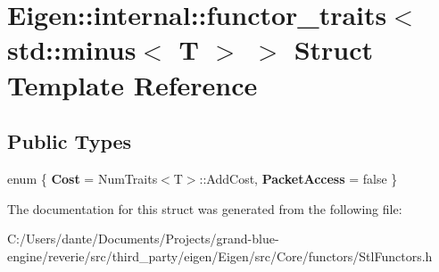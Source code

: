 \hypertarget{struct_eigen_1_1internal_1_1functor__traits_3_01std_1_1minus_3_01_t_01_4_01_4}{}\section{Eigen\+::internal\+::functor\+\_\+traits$<$ std\+::minus$<$ T $>$ $>$ Struct Template Reference}
\label{struct_eigen_1_1internal_1_1functor__traits_3_01std_1_1minus_3_01_t_01_4_01_4}
\subsection*{Public Types}
\begin{DoxyCompactItemize}
\item 
\mbox{\label{struct_eigen_1_1internal_1_1functor__traits_3_01std_1_1minus_3_01_t_01_4_01_4_ac7a8c2646fdc03a4f43cb06f3229bede}} 
enum \{ {\bfseries Cost} = Num\+Traits$<$T$>$\+::Add\+Cost, 
{\bfseries Packet\+Access} = false
 \}
\end{DoxyCompactItemize}


The documentation for this struct was generated from the following file\+:\begin{DoxyCompactItemize}
\item 
C\+:/\+Users/dante/\+Documents/\+Projects/grand-\/blue-\/engine/reverie/src/third\+\_\+party/eigen/\+Eigen/src/\+Core/functors/Stl\+Functors.\+h\end{DoxyCompactItemize}
